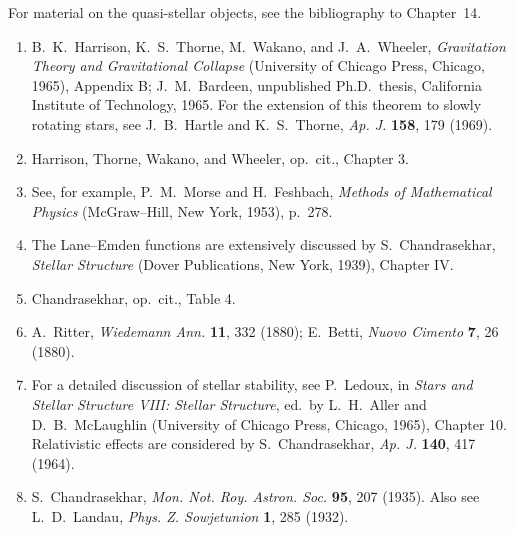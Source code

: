 For material on the quasi-stellar objects, see the bibliography to Chapter~14.


\begin{enumerate}
  \item {}\label{ch11-ref-1}
  B.~K.~Harrison, K.~S.~Thorne, M.~Wakano, and J.~A.~Wheeler,
  \emph{Gravitation Theory and Gravitational Collapse} (University of
  Chicago Press, Chicago, 1965), Appendix B; J.~M.~Bardeen, unpublished
  Ph.D.\ thesis, California Institute of Technology, 1965. For the
  extension of this theorem to slowly rotating stars, see J.~B.~Hartle and
  K.~S.~Thorne, \emph{Ap. J.} \textbf{158}, 179 (1969).

  \item {}\label{ch11-ref-2}
  Harrison, Thorne, Wakano, and Wheeler, op.\ cit., Chapter 3.

  \item {}\label{ch11-ref-3}
  See, for example, P.~M.~Morse and H.~Feshbach, \emph{Methods of
  Mathematical Physics} (McGraw--Hill, New York, 1953), p.~278.

  \item {}\label{ch11-ref-4}
  The Lane--Emden functions are extensively discussed by S.~Chandrasekhar,
  \emph{Stellar Structure} (Dover Publications, New York, 1939),
  Chapter IV.

  \item {}\label{ch11-ref-5}
  Chandrasekhar, op.\ cit., Table 4.

  \item {}\label{ch11-ref-6}
  A.~Ritter, \emph{Wiedemann Ann.} \textbf{11}, 332 (1880);
  E.~Betti, \emph{Nuovo Cimento} \textbf{7}, 26 (1880).

  \item {}\label{ch11-ref-7}
  For a detailed discussion of stellar stability, see P.~Ledoux, in
  \emph{Stars and Stellar Structure VIII: Stellar Structure}, ed.\ by
  L.~H.~Aller and D.~B.~McLaughlin (University of Chicago Press, Chicago,
  1965), Chapter 10. Relativistic effects are considered by
  S.~Chandrasekhar, \emph{Ap. J.} \textbf{140}, 417 (1964).

  \item {}\label{ch11-ref-8}
  S.~Chandrasekhar, \emph{Mon. Not. Roy. Astron. Soc.} \textbf{95}, 207
  (1935). Also see L.~D.~Landau, \emph{Phys. Z. Sowjetunion} \textbf{1},
  285 (1932).


\end{enumerate}
